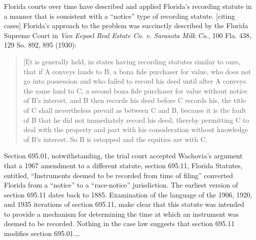 Florida courts over time have described and applied Florida's recording statute
in a manner that is consistent with a ``notice'' type of recording
statute. [citing cases] Florida's approach to the problem was succinctly
described by the Florida Supreme Court in \textit{Van Eepoel Real Estate Co. v.
Sarasota Milk Co}., 100 Fla. 438, 129 So. 892, 895 (1930):
\begin{quote}
[I]t is generally held, in states having recording statutes similar to ours,
that if A conveys lands to B, a bona fide purchaser for value, who does not go
into possession and who failed to record his deed until after A conveys the
same land to C, a second bona fide purchaser for value without notice of B's
interest, and B then records his deed before C records his, the title of C
shall nevertheless prevail as between C and B, because it is the fault of B
that he did not immediately record his deed, thereby permitting C to deal with
the property and part with his consideration without knowledge of B's interest.
So B is estopped and the equities are with C.
\end{quote}

Section 695.01, notwithstanding, the trial court accepted Wachovia's argument
that a 1967 amendment to a different statute, section 695.11, Florida Statutes,
entitled, ``Instruments deemed to be recorded from time of filing'' converted
Florida from a ``notice'' to a ``race-notice'' jurisdiction. The earliest version of section
695.11 dates back to 1885. Examination of the language of the 1906, 1920, and
1935 iterations of section 695.11, make clear that this statute was intended to
provide a mechanism for determining the time at which an instrument was deemed
to be recorded. Nothing in the case law suggests that section
695.11 modifies section 695.01.\dots {} 

